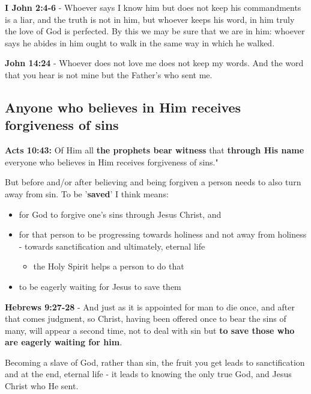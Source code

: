 \documentclass[11pt]{article}
\begin{document}
\textbf{I John 2:4-6} - Whoever says I know him but does not keep his commandments is a liar, and the truth is not in him, but whoever keeps his word, in him truly the love of God is perfected. By this we may be sure that we are in him: whoever says he abides in him ought to walk in the same way in which he walked.

\textbf{John 14:24} - Whoever does not love me does not keep my words. And the word that you hear is not mine but the Father's who sent me.

\subsection{Anyone who believes in Him receives forgiveness of sins}
\label{sec:orge92013b}
\textbf{Acts 10:43:} Of Him all \textbf{the prophets bear witness} that \textbf{through His name} everyone who believes in Him receives forgiveness of sins."

But before and/or after believing and being forgiven a person needs to also turn away from sin.
To be '\textbf{saved}' I think means:
\begin{itemize}
\item for God to forgive one's sins through Jesus Christ, and
\item for that person to be progressing towards holiness and not away from holiness - towards sanctification and ultimately, eternal life
\begin{itemize}
\item the Holy Spirit helps a person to do that
\end{itemize}
\item to be eagerly waiting for Jesus to save them
\end{itemize}

\textbf{Hebrews 9:27-28} - And just as it is appointed for man to die once, and after that comes judgment, so Christ, having been offered once to bear the sins of many, will appear a second time, not to deal with sin but \textbf{to save those who are eagerly waiting for him}.

Becoming a slave of God, rather than sin, the fruit you get leads to sanctification and at the end, eternal life - it leads to knowing the only true God, and Jesus Christ who He sent.
\end{document}
